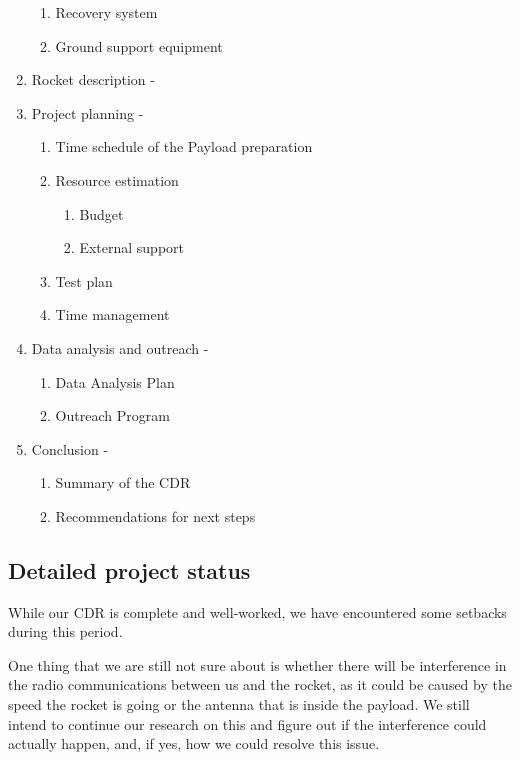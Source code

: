 \begin{enumerate}[label=\arabic*.,leftmargin=*]
\begin{enumerate}[label=\arabic*.]
        \item Recovery system
        \item Ground support equipment
    \end{enumerate}
    \item Rocket description - \done
    \item Project planning - \done
    \begin{enumerate}[label=\arabic*.]
        \item Time schedule of the Payload preparation
        \item Resource estimation
        \begin{enumerate}[label=\arabic*.]
            \item Budget
            \item External support
        \end{enumerate}
        \item Test plan
        \item Time management
    \end{enumerate}
    \item Data analysis and outreach - \done
    \begin{enumerate}[label=\arabic*.]
        \item Data Analysis Plan
        \item Outreach Program
    \end{enumerate}
    \item Conclusion - \done
    \begin{enumerate}[label=\arabic*.]
        \item Summary of the CDR
        \item Recommendations for next steps
    \end{enumerate}
\end{enumerate}

\subsection{Detailed project status}

While our CDR is complete and well-worked, we have encountered some setbacks during this period. 

One thing that we are still not sure about is whether there will be interference in the radio communications between us and the rocket, as it could be caused by the speed the rocket is going or the antenna that is inside the payload. We still intend to continue our research on this and figure out if the interference could actually happen, and, if yes, how we could resolve this issue.

